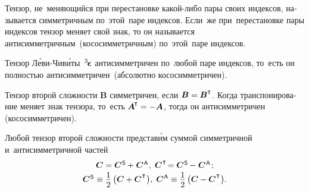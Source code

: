 

\label{para:tensors.symmetric+skewsymmetric}

\begin{otherlanguage}{russian}

Тензор, не~меняющийся при перестановке какой\hbox{-}либо пары своих индексов, называется симметричным по~этой~паре индексов. Если~же при~перестановке пары индексов тензор меняет свой знак, то он называется антисимметричным~(кососимметричным) по~этой~паре индексов.

Тензор Л\'{е}ви\hbox{-\!}Чив\'{и}ты~${^3\hspace{-0.25ex}\bm{\epsilon}}\hspace{.05ex}$ антисимметричен по~любой паре индексов, то~есть он полностью антисимметричен~(абсолютно кососимметричен).

Тензор второй сложности ${\bm{B}}$ симметричен, если ${\bm{B} = \bm{B}^\T}$. Когда транспонирование меняет знак тензора, то~есть ${\bm{A}^{\hspace{-0.1em}\T} = - \bm{A}}$, тогда он антисимметричен (кососимметричен).

Любой тензор второй сложности представ\'{и}м суммой симметричной и~антисимметричной частей
\vspace{0.2em}\begin{equation}\begin{array}{c}
\bm{C} = \bm{C}^{\mathsf{\hspace{0.1ex}S}} \hspace{-0.1ex}+\hspace{0.1ex} \bm{C}^{\mathsf{\hspace{0.1ex}A}}\hspace{0.1ex} , \;
\bm{C}^{\hspace{0.1ex}\T} \hspace{-0.32ex} = \bm{C}^{\mathsf{\hspace{0.1ex}S}} \hspace{-0.1ex}-\hspace{0.1ex} \bm{C}^{\mathsf{\hspace{0.1ex}A}}\hspace{0.2ex} ; \\[0.2em]
\bm{C}^{\mathsf{\hspace{0.1ex}S}} \equiv \displaystyle \onehalf \left({\bm{C} + \bm{C}^{\hspace{0.1ex}\T}}\hspace{0.1ex}\right)\!, \;
\bm{C}^{\mathsf{\hspace{0.1ex}A}} \equiv \displaystyle \onehalf \left({\bm{C} - \bm{C}^{\hspace{0.1ex}\T}}\hspace{0.1ex}\right)\!.
\end{array}\end{equation}


\end{otherlanguage}
